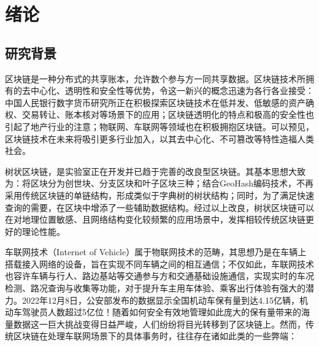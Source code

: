 %
%
%
%
%
%

\chapter{绪论}

\section{研究背景}

区块链是一种分布式的共享账本，允许数个参与方一同共享数据\cite{blockchainTech}。区块链技术所拥有的去中心化、透明性和安全性等优势，令这一新兴的概念迅速为各行各业接受：中国人民银行数字货币研究所正在积极探索区块链技术在低并发、低敏感的资产确权、交易转让、账本核对等场景下的应用\cite{shuYanSuo}；区块链透明化的特点和极高的安全性也引起了地产行业的注意\cite{usageOfBC}；物联网、车联网等领域也在积极拥抱区块链\cite{CAMPANILE2021102511}。可以预见，区块链技术在未来将吸引更多行业加入，以其去中心化、不可篡改等特性造福人类社会。

树状区块链，是实验室正在开发并已趋于完善的改良型区块链\cite{sensors}。其基本思想大致为：将区块分为创世块、分支区块和叶子区块三种；结合GeoHash编码技术，不再采用传统区块链的单链结构，形成类似于字典树的树状结构；同时，为了满足快速查询的需要，在区块中增添了一些辅助数据结构。经过以上改良，树状区块链可以在对地理位置敏感、且网络结构变化较频繁的应用场景中，发挥相较传统区块链更好的理论性能。

车联网技术（Internet of Vehicle）属于物联网技术的范畴，其思想乃是在车辆上搭载接入网络的设备，旨在实现不同车辆之间的相互通信；不仅如此，车联网技术也容许车辆与行人、路边基站等交通参与方和交通基础设施通信，实现实时的车况检测、路况查询与收集等功能，对于提升车主用车体验、乘客出行体验有强大的潜力\cite{IoV}。2022年12月8日，公安部发布的数据显示全国机动车保有量到达4.15亿辆，机动车驾驶员人数超过5亿位！随着如何安全有效地管理如此庞大的保有量带来的海量数据这一巨大挑战变得日益严峻，人们纷纷将目光转移到了区块链上\cite{bcInIoV}\cite{blockchainTechInIoV}。然而，传统区块链在处理车联网场景下的具体事务时，往往存在诸如此类的一些弊端：


